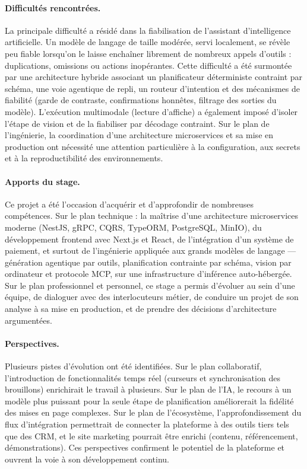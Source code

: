 \documentclass[12pt,a4paper,oneside]{report}
\begin{document}
\paragraph{Difficultés rencontrées.}
La principale difficulté a résidé dans la fiabilisation de l'assistant
d'intelligence artificielle. Un modèle de langage de taille modérée, servi
localement, se révèle peu fiable lorsqu'on le laisse enchaîner librement de
nombreux appels d'outils : duplications, omissions ou actions inopérantes.
Cette difficulté a été surmontée par une architecture hybride associant un
planificateur déterministe contraint par schéma, une voie agentique de
repli, un routeur d'intention et des mécanismes de fiabilité (garde de
contraste, confirmations honnêtes, filtrage des sorties du modèle).
L'exécution multimodale (lecture d'affiche) a également imposé d'isoler
l'étape de vision et de la fiabiliser par décodage contraint. Sur le plan de
l'ingénierie, la coordination d'une architecture microservices et sa mise en
production ont nécessité une attention particulière à la configuration, aux
secrets et à la reproductibilité des environnements.

\paragraph{Apports du stage.}
Ce projet a été l'occasion d'acquérir et d'approfondir de nombreuses
compétences. Sur le plan technique : la maîtrise d'une architecture
microservices moderne (NestJS, gRPC, CQRS, TypeORM, PostgreSQL, MinIO), du
développement frontend avec Next.js et React, de l'intégration d'un système
de paiement, et surtout de l'ingénierie appliquée aux grands modèles de
langage — génération agentique par outils, planification contrainte par
schéma, vision par ordinateur et protocole MCP, sur une infrastructure
d'inférence auto-hébergée. Sur le plan professionnel et personnel, ce stage
a permis d'évoluer au sein d'une équipe, de dialoguer avec des interlocuteurs
métier, de conduire un projet de son analyse à sa mise en production, et de
prendre des décisions d'architecture argumentées.

\paragraph{Perspectives.}
Plusieurs pistes d'évolution ont été identifiées. Sur le plan collaboratif,
l'introduction de fonctionnalités temps réel (curseurs et synchronisation des
brouillons) enrichirait le travail à plusieurs. Sur le plan de l'IA, le
recours à un modèle plus puissant pour la seule étape de planification
améliorerait la fidélité des mises en page complexes. Sur le
plan de l'écosystème, l'approfondissement du flux d'intégration permettrait
de connecter la plateforme à des outils tiers tels que des CRM, et le site
marketing pourrait être enrichi (contenu, référencement, démonstrations). Ces
perspectives confirment le potentiel de la plateforme et ouvrent la voie à
son développement continu.
\end{document}
